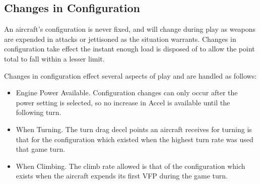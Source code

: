 \begin{advancedrules}
    \subsection{Changes in Configuration}
    An aircraft's configuration is never fixed, and will change during play as weapons are expended in attacks or jettisoned as the situation warrants. Changes in configuration take effect the instant enough load is disposed of to allow the point total to fall within a lesser limit.

    Changes in configuration effect several aspects of play and are handled as follows:

    \begin{itemize}

        \item Engine Power Available. Configuration changes can only occur after the power setting is selected, so no increase in Accel is available until the following turn.


        \item When Turning. The turn drag decel points an aircraft receives for turning is that for the configuration which existed when the highest turn rate was used that game turn.

        \item When Climbing. The climb rate allowed is that of the configuration which exists when the aircraft expends its first VFP during the game turn.

    \end{itemize}




\end{advancedrules}

